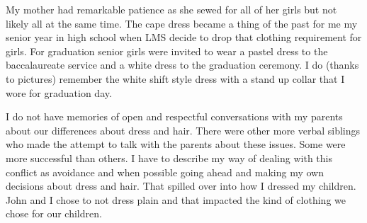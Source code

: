 My mother had remarkable patience as she sewed for all of her girls but not likely all at the same time.
The cape dress became a thing of the past for me my senior year in high school when LMS decide to drop that clothing requirement for girls.
For graduation senior girls were invited to wear a pastel dress to the baccalaureate service and a white dress to the graduation ceremony.
I do (thanks to pictures) remember the white shift style dress with a stand up collar that I wore for graduation day.

I do not have memories of open and respectful conversations with my parents about our differences about dress and hair.
There were other more verbal siblings who made the attempt to talk with the parents about these issues.
Some were more successful than others.
I have to describe my way of dealing with this conflict as avoidance and when possible going ahead and making my own decisions about dress and hair.
That spilled over into how I dressed my children.
John and I chose to not dress plain and that impacted the kind of clothing we chose for our children.





